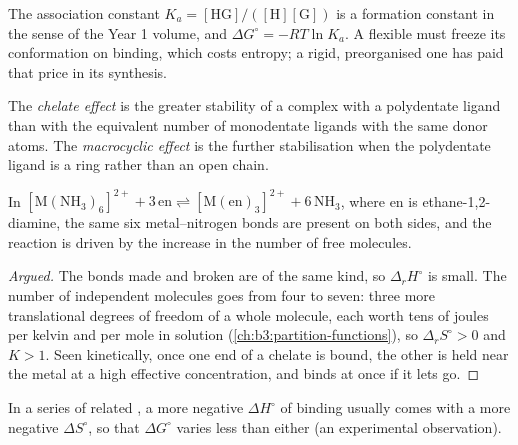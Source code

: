 The association constant $K_a = [\mathrm{HG}]/([\mathrm H][\mathrm G])$ is a formation constant in the sense of
the Year 1 volume, and $\Delta G^\circ = -RT\ln K_a$. A flexible  must freeze its
conformation on binding, which costs entropy; a rigid, preorganised one has
paid that price in its synthesis.

\begin{definition}\label{def:b3:supramolecular:macrocyclic}
The \emph{chelate effect} is the greater stability of a
complex with a polydentate ligand than with the equivalent number of
monodentate ligands with the same donor atoms. The \emph{macrocyclic
effect} is the further stabilisation when the
polydentate ligand is a ring rather than an open chain.
\end{definition}

\begin{proposition}\label{prop:b3:supramolecular:chelate-entropy}
In $\mathrm{[M(NH_3)_6]^{2+} + 3\,en \rightleftharpoons [M(en)_3]^{2+} + 6\,NH_3}$, where en is ethane-1,2-diamine, the same six
metal--nitrogen bonds are present on both sides, and the reaction is driven by
the increase in the number of free molecules.
\end{proposition}

\begin{proof}[Argued]
The bonds made and broken are of the same kind, so $\Delta_rH^\circ$ is small. The number of
independent molecules goes from four to seven: three more translational
degrees of freedom of a whole molecule, each worth tens of joules per kelvin
and per mole in solution (\cref{ch:b3:partition-functions}), so $\Delta_rS^\circ > 0$ and $K > 1$.
Seen kinetically, once one end of a chelate is bound, the other is held near the
metal at a high effective concentration, and binds at once if it lets go.
\end{proof}

\begin{proposition}\label{prop:b3:supramolecular:compensation}
In a series of related , a more negative $\Delta H^\circ$ of binding
usually comes with a more negative $\Delta S^\circ$, so that $\Delta G^\circ$ varies less than either (an
experimental observation).
\end{proposition}

